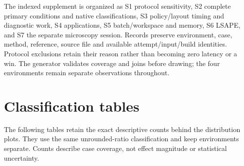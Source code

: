 \documentclass[11pt,a4paper]{article}
\begin{document}
The indexed supplement is organized as S1 protocol sensitivity, S2 complete primary conditions and native classifications, S3 policy/layout timing and diagnostic work, S4 applications, S5 batch/workspace and memory, S6 LSAPE, and S7 the separate microscopy session. Records preserve environment, case, method, reference, source file and available attempt/input/build identities. Protocol exclusions retain their reason rather than becoming zero latency or a win. The generator validates coverage and joins before drawing; the four environments remain separate observations throughout.


\FloatBarrier
\section{Classification tables}\label{app:classifications}

The following tables retain the exact descriptive counts behind the distribution plots. They use the same unrounded-ratio classification and keep environments separate. Counts describe case coverage, not effect magnitude or statistical uncertainty.

\begin{table}[!htbp]
\centering
\caption{Native optional wins/ties/losses by workload family and environment. Each environment contains 166 optional cases. Required JVRUST/JVHYBRID/JVCPP each win all 102 required cases. Family denominators are retained; environments are not pooled.}
\label{tab:nativefamilies}
\begingroup\footnotesize
\setlength{\tabcolsep}{3pt}
\renewcommand{\arraystretch}{1.12}

\endgroup
\end{table}
\FloatBarrier

\begin{table}[!htbp]
\centering
\caption{Every workload with at least one optional native practical tie or loss, with reference/method ratios by environment. All three use congested-block costs but belong to distinct formulation, scaling and congestion families. Classification uses unrounded ratios; displayed values are rounded.}
\label{tab:nativeexceptions}
\begingroup\footnotesize
\setlength{\tabcolsep}{3pt}
\renewcommand{\arraystretch}{1.12}

\endgroup
\end{table}
\FloatBarrier

\begin{table}[!htbp]
\centering
\caption{LSAPE wins/ties/losses by family and Windows environment. Counts classify each case's median of three process ratios. $O/P$ is the frozen primary comparison; $O/U$, $U/P$, $P/T$ and $S/T$ retain their distinct controlled interpretations.}
\label{tab:lsapefamilies}
\begingroup\footnotesize
\setlength{\tabcolsep}{3pt}
\renewcommand{\arraystretch}{1.12}

\endgroup
\end{table}
\FloatBarrier
\end{document}
